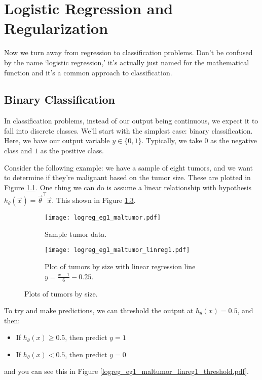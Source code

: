 \chapter{Logistic Regression and Regularization}

Now we turn away from regression to classification problems. Don't be confused by the name `logistic regression,' it's actually just named for the mathematical function and it's a common approach to classification.

\section{Binary Classification}
In classification problems, instead of our output being continuous, we expect it to fall into discrete classes. We'll start with the simplest case: binary classification. Here, we have our output variable $y \in \{0, 1\}$. Typically, we take $0$ as the negative class and $1$ as the positive class. 

Consider the following example: we have a sample of eight tumors, and we want to determine if they're malignant based on the tumor size. These are plotted in Figure \ref{logreg-eg-maltumor-noregline}. One thing we can do is assume a linear relationship with hypothesis $h_\theta\left( \vec{x} \right) = \vec{\theta}^\intercal \vec{x}$. This shown in Figure \ref{logreg_eg1_maltumor_linreg1}.

\begin{figure}[h]
	\centering
	\begin{subfigure}[t]{0.45\textwidth}
   		\centering
    		\graphicspath{{./Figures/}}
  		\texttt{[image: logreg\_eg1\_maltumor.pdf]} 
   		\caption[]{Sample tumor data.}
   		\label{logreg-eg-maltumor-noregline}
	\end{subfigure}
	\begin{subfigure}[t]{0.45\textwidth}
   		\centering
    		\graphicspath{{./Figures/}}
   		\texttt{[image: logreg\_eg1\_maltumor\_linreg1.pdf]} 
   		\caption[]{Plot of tumors by size with linear regression line $y =  \frac{x-1}{6} - 0.25$.}
   		\label{logreg_eg1_maltumor_linreg1}
	\end{subfigure}
	\caption[]{Plots of tumors by size.}
\end{figure}

To try and make predictions, we can threshold the output at $h_\theta\left( x \right) = 0.5$, and then:
\begin{itemize}
\item If $h_\theta\left(x\right) \geq 0.5$, then predict $y = 1$
\item If $h_\theta\left( x \right) < 0.5$, then predict $y = 0$
\end{itemize}
and you can see this in Figure \ref{logreg_eg1_maltumor_linreg1_threshold.pdf}.


